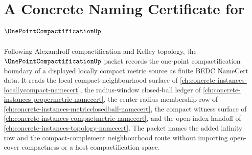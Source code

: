 \chapter{A Concrete Naming Certificate for $\OnePointCompactificationUp$}
\label{ch:concrete-instances-one-point-compactification-namecert}

Following Alexandroff compactification and Kelley topology, the $\OnePointCompactificationUp$ packet records the one-point compactification boundary of a displayed locally compact metric source as finite BEDC NameCert data. It reads the local compact-neighbourhood surface of \autoref{ch:concrete-instances-locallycompact-namecert}, the radius-window closed-ball ledger of \autoref{ch:concrete-instances-propermetric-namecert}, the center-radius membership row of \autoref{ch:concrete-instances-metricclosedball-namecert}, the compact witness surface of \autoref{ch:concrete-instances-compactmetric-namecert}, and the open-index handoff of \autoref{ch:concrete-instances-topology-namecert}. The packet names the added infinity row and the compact-complement neighbourhood route without importing open-cover compactness or a host compactification space.

